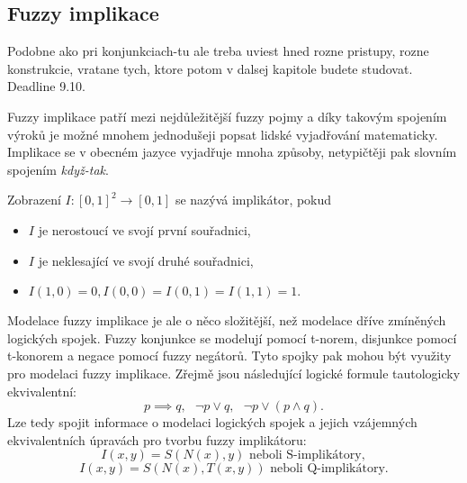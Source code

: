 \begin{graph}
\end{graph}

\subsection{Fuzzy implikace} {\color{red}Podobne ako pri konjunkciach-tu ale treba uviest hned rozne pristupy, rozne konstrukcie, vratane tych, ktore potom v dalsej kapitole budete studovat. Deadline 9.10.
\\}

Fuzzy implikace patří mezi nejd\r uležitější fuzzy pojmy a díky takovým spojením výrok\r u je možné mnohem jednodušeji popsat lidské vyjadřování matematicky. Implikace se v obecném jazyce vyjadřuje mnoha zp\r usoby, netypičtěji pak slovním spojením \textit{když-tak}.
\begin{definition}
    Zobrazení $I: [0,1]^2 \rightarrow [0,1] $ se nazývá implikátor, pokud
    \begin{itemize}
        \item $I$ je nerostoucí ve svojí první souřadnici,
        \item $I$ je neklesající ve svojí druhé souřadnici,
        \item $I(1,0) = 0, I(0,0) =  I(0,1) = I(1,1) = 1.$
    \end{itemize}
\end{definition}

Modelace fuzzy implikace je ale o něco složitější, než modelace dříve zmíněných logických spojek. Fuzzy konjunkce se modelují pomocí t-norem, disjunkce pomocí t-konorem a negace pomocí fuzzy negátor\r u. Tyto spojky pak mohou být využity pro modelaci fuzzy implikace. Zřejmě jsou následující logické formule tautologicky ekvivalentní: $$ p\implies q, \mbox{   } \neg p \vee q, \mbox{   } \neg p\vee (p\wedge q) .$$ Lze tedy spojit informace o modelaci logických spojek a jejich vzájemných ekvivalentních \' upravách pro tvorbu fuzzy implikátoru: $$I(x,y)=S(N(x),y)\text{ neboli S-implikátory},$$
$$I(x,y)=S(N(x),T(x,y)) \text{ neboli Q-implikátory}.$$

